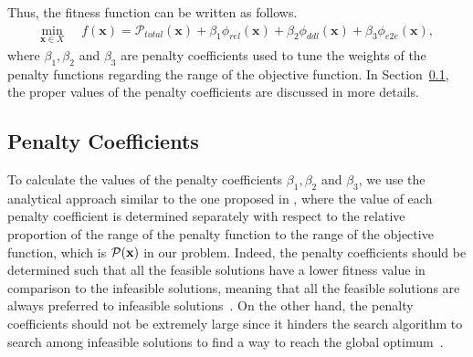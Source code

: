 Thus, the fitness function can be written as follows.
\begin{align}
\label{eqn_penalityfunc}
\min_{\textbf{x}\in X}\;\;& f(\textbf{x})=\mathcal{P}_{total}(\textbf{x}) + \beta_1 \phi_{rel}(\textbf{x}) + \beta_2 \phi_{ddl}(\textbf{x}) + \beta_3 \phi_{e2e}(\textbf{x}),
\end{align}
where $\beta_1,\beta_2$ and $\beta_3$ are penalty coefficients used to tune the weights of the penalty functions regarding the range of the objective function. In Section~\ref{sec:penaltycoefficient}, the proper values of the penalty coefficients are discussed in more details.





\subsection{Penalty Coefficients}
\label{sec:penaltycoefficient}
To calculate the values of the penalty coefficients $\beta_1,\beta_2$ and $\beta_3$, we use the analytical approach similar to the one proposed in \cite{Faragardi2018AnSystems},
where the value of each penalty coefficient is determined separately with respect to the relative proportion of the range of the penalty function to the range of the objective function, which is $\mathcal{P}(\textbf{x})$ in our problem. Indeed, the penalty coefficients should be determined such that all the feasible solutions have a lower fitness value in comparison to the infeasible solutions, meaning that all the feasible solutions are always preferred to infeasible solutions~\cite{faragardi2018AECUs}. On the other hand, the penalty coefficients should not be extremely large since it hinders the search algorithm to search among infeasible solutions to find a way to reach the global optimum~\cite{Talbi2009Metaheuristics:Implementation}.


